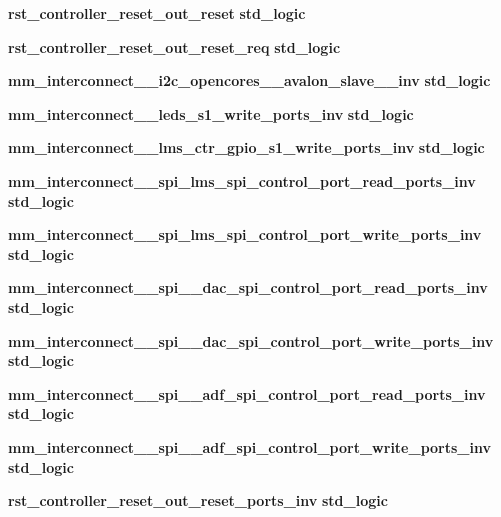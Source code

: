 \begin{DoxyCompactItemize}
\item 
{\bf rst\+\_\+controller\+\_\+reset\+\_\+out\+\_\+reset} {\bfseries \textcolor{comment}{std\+\_\+logic}\textcolor{vhdlchar}{ }} 
\item 
{\bf rst\+\_\+controller\+\_\+reset\+\_\+out\+\_\+reset\+\_\+req} {\bfseries \textcolor{comment}{std\+\_\+logic}\textcolor{vhdlchar}{ }} 
\item 
{\bf mm\+\_\+interconnect\+\_\+\_\+i2c\+\_\+opencores\+\_\+\_\+avalon\+\_\+slave\+\_\+\_\+inv} {\bfseries \textcolor{comment}{std\+\_\+logic}\textcolor{vhdlchar}{ }} 
\item 
{\bf mm\+\_\+interconnect\+\_\+\_\+leds\+\_\+s1\+\_\+write\+\_\+ports\+\_\+inv} {\bfseries \textcolor{comment}{std\+\_\+logic}\textcolor{vhdlchar}{ }} 
\item 
{\bf mm\+\_\+interconnect\+\_\+\_\+lms\+\_\+ctr\+\_\+gpio\+\_\+s1\+\_\+write\+\_\+ports\+\_\+inv} {\bfseries \textcolor{comment}{std\+\_\+logic}\textcolor{vhdlchar}{ }} 
\item 
{\bf mm\+\_\+interconnect\+\_\+\_\+spi\+\_\+lms\+\_\+spi\+\_\+control\+\_\+port\+\_\+read\+\_\+ports\+\_\+inv} {\bfseries \textcolor{comment}{std\+\_\+logic}\textcolor{vhdlchar}{ }} 
\item 
{\bf mm\+\_\+interconnect\+\_\+\_\+spi\+\_\+lms\+\_\+spi\+\_\+control\+\_\+port\+\_\+write\+\_\+ports\+\_\+inv} {\bfseries \textcolor{comment}{std\+\_\+logic}\textcolor{vhdlchar}{ }} 
\item 
{\bf mm\+\_\+interconnect\+\_\+\_\+spi\+\_\+\_\+dac\+\_\+spi\+\_\+control\+\_\+port\+\_\+read\+\_\+ports\+\_\+inv} {\bfseries \textcolor{comment}{std\+\_\+logic}\textcolor{vhdlchar}{ }} 
\item 
{\bf mm\+\_\+interconnect\+\_\+\_\+spi\+\_\+\_\+dac\+\_\+spi\+\_\+control\+\_\+port\+\_\+write\+\_\+ports\+\_\+inv} {\bfseries \textcolor{comment}{std\+\_\+logic}\textcolor{vhdlchar}{ }} 
\item 
{\bf mm\+\_\+interconnect\+\_\+\_\+spi\+\_\+\_\+adf\+\_\+spi\+\_\+control\+\_\+port\+\_\+read\+\_\+ports\+\_\+inv} {\bfseries \textcolor{comment}{std\+\_\+logic}\textcolor{vhdlchar}{ }} 
\item 
{\bf mm\+\_\+interconnect\+\_\+\_\+spi\+\_\+\_\+adf\+\_\+spi\+\_\+control\+\_\+port\+\_\+write\+\_\+ports\+\_\+inv} {\bfseries \textcolor{comment}{std\+\_\+logic}\textcolor{vhdlchar}{ }} 
\item 
{\bf rst\+\_\+controller\+\_\+reset\+\_\+out\+\_\+reset\+\_\+ports\+\_\+inv} {\bfseries \textcolor{comment}{std\+\_\+logic}\textcolor{vhdlchar}{ }} 
\end{DoxyCompactItemize}
